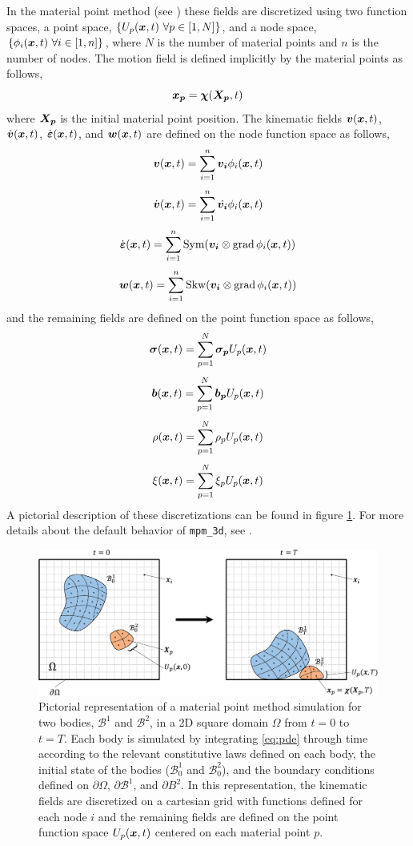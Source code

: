 In the material point method (see \cite{sulsky1994}) these fields are discretized using two function spaces, a point space, \(\{U_p(\boldsymbol{x},t)\ \forall p \in [1,N]\}\), and a node space, \(\{\phi_i(\Vector{x},t)\ \forall i \in [1,n]\}\), where \(N\) is the number of material points and \(n\) is the number of nodes. The motion field is defined implicitly by the material points as follows,
\[\boldsymbol{x_p} = \boldsymbol{\chi}(\boldsymbol{X_p},t)\]
where \(\boldsymbol{X_p}\) is the initial material point position. The kinematic fields \(\boldsymbol{v}(\boldsymbol{x},t)\), \(\dot{\boldsymbol{v}}(\boldsymbol{x},t)\), \(\dot{\boldsymbol{\varepsilon}}(\boldsymbol{x},t)\), and \(\boldsymbol{w}(\boldsymbol{x},t)\) are defined on the node function space as follows,
\[\boldsymbol{v}(\boldsymbol{x},t) = \sum_{i=1}^{n} \boldsymbol{v_i} \phi_i(\boldsymbol{x},t)\]
\[\dot{\boldsymbol{v}}(\boldsymbol{x},t) = \sum_{i=1}^{n} \dot{\boldsymbol{v_i}} \phi_i(\boldsymbol{x},t)\]
\[\dot{\boldsymbol{\varepsilon}}(\boldsymbol{x},t) = \sum_{i=1}^{n} \operatorname{Sym}(\boldsymbol{v_i} \otimes \operatorname{grad}{\phi_i(\boldsymbol{x},t)})\]
\[\boldsymbol{w}(\boldsymbol{x},t) = \sum_{i=1}^{n} \operatorname{Skw}(\boldsymbol{v_i} \otimes \operatorname{grad}{\phi_i(\boldsymbol{x},t)})\]
and the remaining fields are defined on the point function space as follows,
\[\boldsymbol{\sigma}(\boldsymbol{x},t) = \sum_{p=1}^{N} \boldsymbol{\sigma_p} U_p(\boldsymbol{x},t)\]
\[\boldsymbol{b}(\boldsymbol{x},t) = \sum_{p=1}^{N} \boldsymbol{b_p} U_p(\boldsymbol{x},t)\]
\[\rho(\boldsymbol{x},t) = \sum_{p=1}^{N} \rho_p U_p(\boldsymbol{x},t)\]
\[\xi(\boldsymbol{x},t) = \sum_{p=1}^{N} \xi_p U_p(\boldsymbol{x},t)\]
A pictorial description of these discretizations can be found in figure \ref{fig:simulation}. For more details about the default behavior of \texttt{mpm\_3d}, see \cite{dunatunga2017}.

\begin{figure}[!ht]
\centering
\includegraphics[scale=0.5]{images/SimulationDiagram.pdf}
\caption{Pictorial representation of a material point method simulation for two bodies, $\mathcal{B}^1$ and $\mathcal{B}^2$, in a 2D square domain $\Omega$ from $t=0$ to $t=T$. Each body is simulated by integrating \eqref{eq:pde} through time according to the relevant constitutive laws defined on each body, the initial state of the bodies ($\mathcal{B}_0^1$ and $\mathcal{B}_0^2$), and the boundary conditions defined on $\partial \Omega$, $\partial \mathcal{B}^1$, and $\partial{B}^2$. In this representation, the kinematic fields are discretized on a cartesian grid with functions defined for each node $i$ and the remaining fields are defined on the point function space $U_p(\boldsymbol{x}, t)$ centered on each material point $p$.} \label{fig:simulation}
\end{figure}


